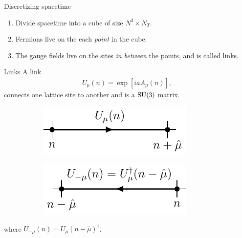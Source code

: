 \documentclass[10pt,show notes on second screen]{beamer}
\begin{document}
\begin{frame}{Discretizing spacetime}
\begin{enumerate}[<+->]
    \item Divide spacetime into a cube of size $N^3\times N_T$.
    \item Fermions live on the each \textit{point} in the cube.
    \item The gauge fields live on the sites \textit{in between} the points, and is called links.
\end{enumerate}
\end{frame}

\begin{frame}{Links}
A link
\begin{align*}
    U_\mu(n) = \exp \left[ i a A_\mu (n) \right],
\end{align*}
connects one lattice site to another and is a $\mathrm{SU}(3)$ matrix.
\begin{figure}[h!tb]
    \centering
    \begin{subfigure}{0.48\textwidth}
        \centering
        \includegraphics{../figures/illustrations/lqcd/links/link}
        \label{fig:lqcd:link}
    \end{subfigure}
    \begin{subfigure}{0.48\textwidth}
        \centering
        \includegraphics{../figures/illustrations/lqcd/links/link-inverse}
        \label{fig:lqcd:link-inverse}
    \end{subfigure}
    \centering
\end{figure}
where $U_{-\mu}(n) = U_\mu(n - \hat{\mu})^\dagger$.

\end{frame}
\end{document}
